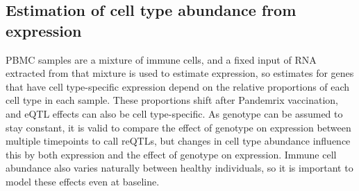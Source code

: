 \subsection{Estimation of cell type abundance from expression}
\label{subsec:hird_reQTL_xCell}

\Gls{PBMC} samples are a mixture of immune cells, and a fixed input of RNA extracted from that mixture is used to estimate expression, 
so estimates for genes that have cell type-specific expression depend on the relative proportions of each cell type in each sample.
These proportions shift after Pandemrix vaccination\autocite{sobolev2016AdjuvantedInfluenzaH1N1Vaccination},
and \gls{eQTL} effects can also be cell type-specific.
As genotype can be assumed to stay constant, it is valid to compare the effect of genotype on expression between multiple timepoints to call \glspl{reQTL}, 
but changes in cell type abundance influence this by  both expression and the effect of genotype on expression.
Immune cell abundance also varies naturally between healthy individuals\autocite{brodin2015VariationHumanImmune,brodin2017HumanImmuneSystem}, so it is important to model these effects even at baseline.

